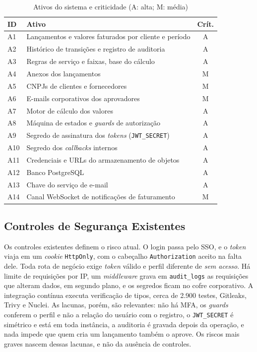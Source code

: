 \documentclass[conference]{IEEEtran}
\begin{document}
\begin{table}[!t]
\centering
\caption{Ativos do sistema e criticidade (A: alta; M: média)}
\label{tab:ativos}
\footnotesize
\renewcommand{\arraystretch}{1.15}
\begin{tabularx}{\columnwidth}{@{}l Y c@{}}
\hline
\textbf{ID} & \textbf{Ativo} & \textbf{Crít.} \\
\hline
A1 & Lançamentos e valores faturados por cliente e período & A \\
A2 & Histórico de transições e registro de auditoria & A \\
A3 & Regras de serviço e faixas, base do cálculo & A \\
A4 & Anexos dos lançamentos & M \\
A5 & CNPJs de clientes e fornecedores & M \\
A6 & E-mails corporativos dos aprovadores & M \\
A7 & Motor de cálculo dos valores & A \\
A8 & Máquina de estados e \textit{guards} de autorização & A \\
A9 & Segredo de assinatura dos \textit{tokens} (\texttt{JWT\_SECRET}) & A \\
A10 & Segredo dos \textit{callbacks} internos & A \\
A11 & Credenciais e URLs do armazenamento de objetos & A \\
A12 & Banco PostgreSQL & A \\
A13 & Chave do serviço de e-mail & A \\
A14 & Canal WebSocket de notificações de faturamento & M \\
\hline
\end{tabularx}
\end{table}

\subsection{Controles de Segurança Existentes}
\label{subsec:controles-existentes}

Os controles existentes definem o risco atual. O login passa pelo SSO, e o \textit{token} viaja em um \textit{cookie} \texttt{HttpOnly}, com o cabeçalho \texttt{Authorization} aceito na falta dele. Toda rota de negócio exige \textit{token} válido e perfil diferente de \emph{sem acesso}. Há limite de requisições por IP, um \textit{middleware} grava em \texttt{audit\_logs} as requisições que alteram dados, em segundo plano, e os segredos ficam no cofre corporativo. A integração contínua executa verificação de tipos, cerca de 2.900 testes, Gitleaks, Trivy e Nuclei. As lacunas, porém, são relevantes: não há MFA, os \textit{guards} conferem o perfil e não a relação do usuário com o registro, o \texttt{JWT\_SECRET} é simétrico e está em toda instância, a auditoria é gravada depois da operação, e nada impede que quem cria um lançamento também o aprove. Os riscos mais graves nascem dessas lacunas, e não da ausência de controles.
\end{document}
